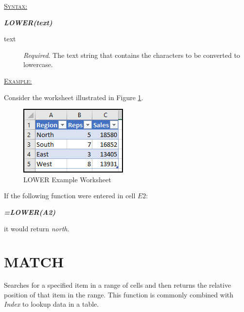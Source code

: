 \begin{addmargin}[1cm]{0cm}
	
	\medskip
	\underline{\textsc{Syntax:}}
	\medskip
	
	{\color{Syntax}
		\noindent\textbf{\textit{LOWER(text)}}
	}
	
	\begin{description}
		\item[text] \textit{Required}. The text string that contains the characters to be converted to lowercase.
	\end{description}

	\medskip
	\noindent\underline{\textsc{Example:}}
	\medskip
	
	\noindent Consider the worksheet illustrated in Figure \ref{apa:low}.
	
	\begin{figure}[H]
		\centering
		\includegraphics[width=\maxwidth{.45\linewidth}]{gfx/apa_fig01}
		\caption{LOWER Example Worksheet}
		\label{apa:low}
	\end{figure}
	
	\noindent If the following function were entered in cell $ E2 $:
	
	{\color{Syntax}
		\textit{\textbf{=LOWER(A2)}}
	}
	
	\noindent it would return \textit{north}.

\end{addmargin}

\section{MATCH}

Searches for a specified item in a range of cells and then returns the relative position of that item in the range. This function is commonly combined with \textit{Index} to lookup data in a table.

